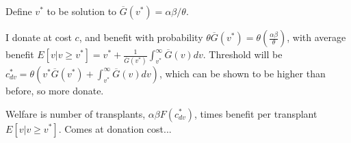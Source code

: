 \documentclass[11pt, oneside]{article}   	%
\begin{document}
Define $v^*$ to be solution to $\overline{G}(v^*) = \alpha \beta/\theta$. 

I donate at cost $c$, and benefit with probability $\theta \overline{G}(v^*) = \theta \left( \frac{\alpha \beta}{\theta} \right)$, with average benefit $E[v \vert v \geq v^*] = v^* + \frac{1}{\overline{G}(v^*)} \int_{v^*}^\infty \overline{G}(v) dv$. Threshold will be $c_{dv}^* = \theta \left(v^* \overline{G}(v^*) + \int_{v^*}^\infty \overline{G}(v) dv \right)$, which can be shown to be higher than before, so more donate.

Welfare is number of transplants, $\alpha \beta F(c_{dv}^*)$, times benefit per transplant $E[v \vert v \geq v^*]$.  {\color{red} Comes at donation cost...}%
\end{document}
